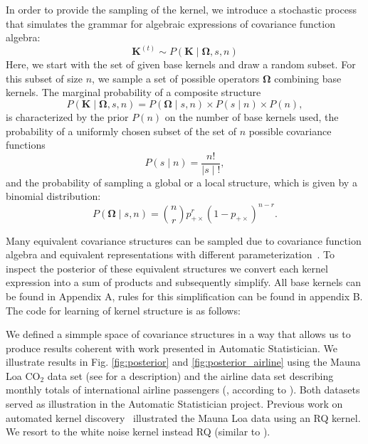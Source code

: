 In order to provide the sampling of the kernel, we introduce a stochastic process that simulates the grammar for algebraic expressions of covariance function algebra:
\begin{equation}
\mathbf{K}^{(t)} \sim  P(\mathbf{K} \mid \bm{\Omega},s,n)
\end{equation}
Here, we start with the set of given base kernels and draw a random subset.
For this subset of size $n$, we sample a set of possible operators $\bm{\Omega}$ combining base kernels. 
The marginal probability of a composite structure
\begin{equation}
P(\mathbf{K} \mid \bm{\Omega},s,n) = P(\bm{\Omega} \mid s,n)\times P(s \mid n) \times P(n),
\end{equation}
is characterized by the prior $P(n)$ on the number of base kernels used, the probability of a uniformly chosen subset of the set of $n$ possible covariance functions
\begin{equation}
\label{eq:subsets}
P(s \mid n) = \frac{n!}{ \mid s \mid !},
\end{equation}
and the probability of sampling a global or a local structure, which is given by a binomial distribution: 
\begin{equation}
P(\bm{\Omega} \mid s,n)= {n \choose r}  p_{+\times}^r (1 - p_{+\times})^{n-r}.
\end{equation}



Many equivalent covariance structures can be sampled due to covariance function algebra and equivalent representations with different parameterization~\citep{lloyd2014automatic}. To inspect the posterior of these equivalent structures we convert each kernel expression into a sum of products and subsequently simplify. All base kernels can be found in Appendix A, rules for this simplification can be found in appendix B. The code for learning of kernel structure is as follows:



We defined a simmple space of covariance structures in a way that allows us to produce results coherent with 
work presented in Automatic Statistician. We illustrate results in Fig. \ref{fig:posterior} and \ref{fig:posterior_airline} using the Mauna Loa  CO$_2$ data set (see \citealp{rasmussen2006gaussian} for a description) and the airline data set describing monthly totals of international airline passengers (\citealp{box2011time}, according to \citealp{duvenaud2013structure}). Both datasets served as illustration in the Automatic Statistician project. Previous work on automated kernel discovery~\citep{duvenaud2013structure} illustrated the Mauna Loa data using an RQ kernel.
We resort to the white noise kernel instead RQ (similar to \citep{lloyd2014automatic}).

